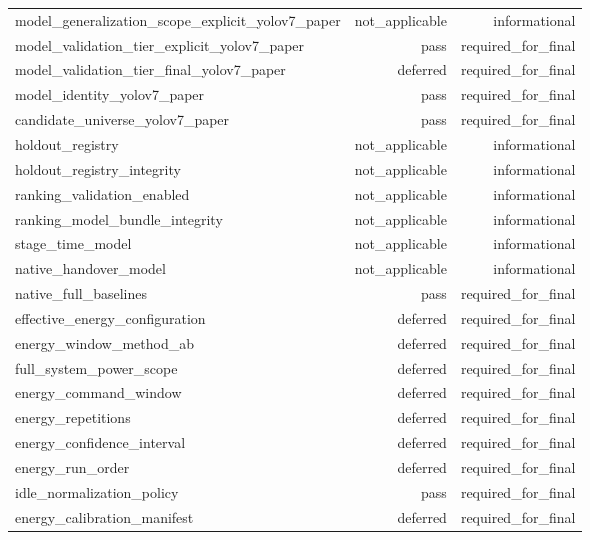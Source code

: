 \begin{table}[t]
\begin{tabular}{lrr}
model\_generalization\_scope\_explicit\_yolov7\_paper & not\_applicable & informational \\
model\_validation\_tier\_explicit\_yolov7\_paper & pass & required\_for\_final \\
model\_validation\_tier\_final\_yolov7\_paper & deferred & required\_for\_final \\
model\_identity\_yolov7\_paper & pass & required\_for\_final \\
candidate\_universe\_yolov7\_paper & pass & required\_for\_final \\
holdout\_registry & not\_applicable & informational \\
holdout\_registry\_integrity & not\_applicable & informational \\
ranking\_validation\_enabled & not\_applicable & informational \\
ranking\_model\_bundle\_integrity & not\_applicable & informational \\
stage\_time\_model & not\_applicable & informational \\
native\_handover\_model & not\_applicable & informational \\
native\_full\_baselines & pass & required\_for\_final \\
effective\_energy\_configuration & deferred & required\_for\_final \\
energy\_window\_method\_ab & deferred & required\_for\_final \\
full\_system\_power\_scope & deferred & required\_for\_final \\
energy\_command\_window & deferred & required\_for\_final \\
energy\_repetitions & deferred & required\_for\_final \\
energy\_confidence\_interval & deferred & required\_for\_final \\
energy\_run\_order & deferred & required\_for\_final \\
idle\_normalization\_policy & pass & required\_for\_final \\
energy\_calibration\_manifest & deferred & required\_for\_final \\
\bottomrule
\end{tabular}
\end{table}
